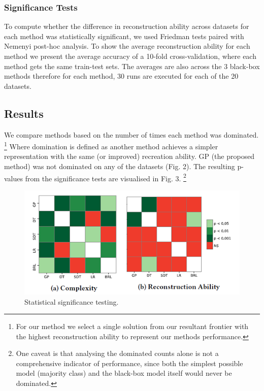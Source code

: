 \subsubsection{Significance Tests}
To compute whether the difference in reconstruction ability across datasets for each method was statistically significant, we used Friedman tests paired with Nemenyi post-hoc analysis. To show the average reconstruction ability for each method we present the average accuracy of a 10-fold cross-validation, where each method gets the same train-test sets. The averages are also across the 3 black-box methods therefore for each method, 30 runs are executed for each of the 20 datasets.
\subsection{Results}
We compare methods based on the number of times each method was dominated. \footnote{For our method we select a single solution from our resultant frontier with the highest reconstruction ability to represent our methods performance.} Where domination is defined as another method achieves a simpler representation with the same (or improved) recreation ability. GP (the proposed method) was not dominated on any of the datasets (Fig. 2). The resulting p-values from the significance tests are visualised in Fig. 3. \footnote{One caveat is that analysing the dominated counts alone is not a comprehensive indicator of performance, since both the simplest possible model (majority class) and the black-box model itself would never be dominated.} 
%
\begin{center}
\begin{figure}[h]
\includegraphics{result_analysis_resized}
\caption{Statistical significance testing.}
\end{figure}
\end{center}


